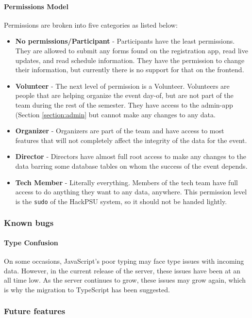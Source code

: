 \documentclass[twoside, 12pt]{article}
\newenvironment{tightitemize} %
{\begin{itemize}\itemsep1pt \parskip0pt \parsep0pt}
{\end{itemize}\vspace{-\topsep}}
\begin{document}
\paragraph{Permissions Model}
\par Permissions are broken into five categories as listed below:
\begin{tightitemize}
    \item \textbf{No permissions/Participant} - Participants have the least permissions. They are allowed to submit any forms found on the registration app, read live updates, and read schedule information. They have the permission to change their information, but currently there is no support for that on the frontend.
    \item \textbf{Volunteer} - The next level of permission is a Volunteer. Volunteers are people that are helping organize the event day-of, but are not part of the team during the rest of the semester. They have access to the admin-app (Section \ref{section:admin} but cannot make any changes to any data.
    \item \textbf{Organizer} - Organizers are part of the team and have access to most features that will not completely affect the integrity of the data for the event.
    \item \textbf{Director} - Directors have almost full root access to make any changes to the data barring some database tables on whom the success of the event depends.
    \item \textbf{Tech Member} - Literally everything. Members of the tech team have full access to do anything they want to any data, anywhere. This permission level is the \texttt{sudo} of the HackPSU system, so it should not be handed lightly.
\end{tightitemize}
\subsubsection{Known bugs}
\paragraph{Type Confusion}
\par On some occasions, JavaScript's poor typing may face type issues with incoming data. However, in the current release of the server, these issues have been at an all time low. As the server continues to grow, these issues may grow again, which is why the migration to TypeScript has been suggested.
\subsubsection{Future features}
\end{document}
